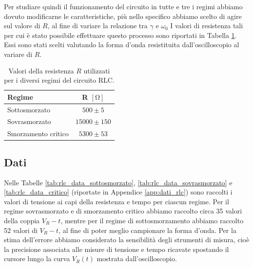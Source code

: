 \documentclass[a4paper]{article}
\begin{document}
Per studiare quindi il funzionamento del circuito in tutte e tre i regimi abbiamo dovuto modificarne le caratteristiche, più nello specifico abbiamo scelto di agire sul valore di $R$, al fine di variare la relazione tra \( \mathit{\gamma}\) e \( \mathit{\omega_0}\) I valori di resistenza tali per cui è stato possibile effettuare questo processo sono riportati in Tabella \ref{tab:rlc_resistenze}. Essi sono stati scelti valutando la forma d'onda resistituita dall'oscilloscopio al variare di $R$.
\begin{table}[htbp] %
\centering
\begin{tabular}{|l|c|}
\hline
Regime & R $[\si{\ohm}]$ \\
\hline
Sottosmorzato & $500 \pm 5$\\
Sovrasmorzato & $15000 \pm 150$ \\ %
Smorzamento critico & $5300 \pm 53$ \\ %
\hline
\end{tabular}
\caption{Valori della resistenza $R$ utilizzati per i diversi regimi del circuito RLC.}
\label{tab:rlc_resistenze}
\end{table}

\subsection{Dati}
Nelle Tabelle \ref{tab:rlc_data_sottosmorzato}, \ref{tab:rlc_data_sovrasmorzato} e \ref{tab:rlc_data_critico} (riportate in Appendice \ref{app:dati_rlc}) sono raccolti i valori di tensione ai capi della resistenza e tempo per ciascun regime. Per il regime sovrasmorzato e di smorzamento critico abbiamo raccolto circa 35 valori della coppia $V_R-t$, mentre per il regime di sottosmorzamento abbiamo raccolto 52 valori di $V_R-t$, al fine di poter meglio campionare la forma d'onda.
Per la stima dell'errore abbiamo considerato la sensibilità degli strumenti di misura, cioè la precisione associata alle misure di tensione e tempo ricavate spostando il cursore lungo la curva $V_R(t)$ mostrata dall'oscilloscopio.

\end{document}
